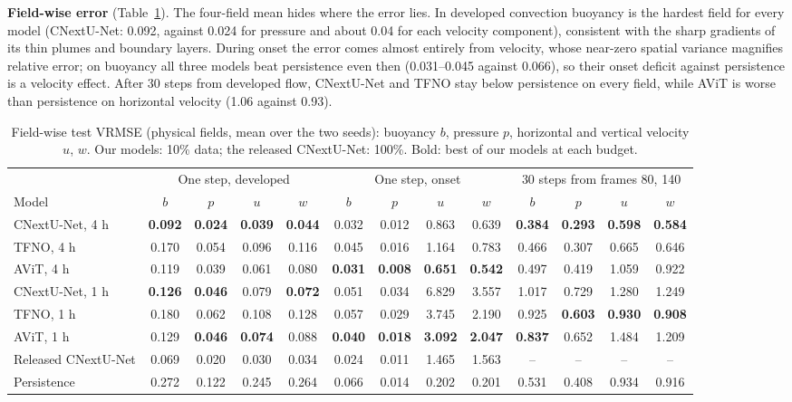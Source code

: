 \documentclass[11pt]{article}
\begin{document}
\textbf{Field-wise error} (Table~\ref{tab:fields}). The four-field mean hides where the error lies. In developed
convection buoyancy is the hardest field for every model (CNextU-Net: 0.092, against 0.024 for pressure and about
0.04 for each velocity component), consistent with the sharp gradients of its thin plumes and boundary layers. During
onset the error comes almost entirely from velocity, whose near-zero spatial variance magnifies relative error; on
buoyancy all three models beat persistence even then (0.031--0.045 against 0.066), so their onset deficit against
persistence is a velocity effect. After 30 steps from developed flow, CNextU-Net and TFNO stay below persistence on
every field, while AViT is worse than persistence on horizontal velocity (1.06 against 0.93).

\begin{table}[!htbp]
\centering\footnotesize
\setlength{\tabcolsep}{3.2pt}
\begin{tabular}{@{}lcccccccccccc@{}}
\toprule
& \multicolumn{4}{c}{One step, developed} & \multicolumn{4}{c}{One step, onset} & \multicolumn{4}{c}{30 steps from frames 80, 140} \\
\cmidrule(lr){2-5}\cmidrule(lr){6-9}\cmidrule(l){10-13}
Model & $b$ & $p$ & $u$ & $w$ & $b$ & $p$ & $u$ & $w$ & $b$ & $p$ & $u$ & $w$ \\
\midrule
CNextU-Net, 4 h & \textbf{0.092} & \textbf{0.024} & \textbf{0.039} & \textbf{0.044} & 0.032 & 0.012 & 0.863 & 0.639 & \textbf{0.384} & \textbf{0.293} & \textbf{0.598} & \textbf{0.584} \\
TFNO, 4 h & 0.170 & 0.054 & 0.096 & 0.116 & 0.045 & 0.016 & 1.164 & 0.783 & 0.466 & 0.307 & 0.665 & 0.646 \\
AViT, 4 h & 0.119 & 0.039 & 0.061 & 0.080 & \textbf{0.031} & \textbf{0.008} & \textbf{0.651} & \textbf{0.542} & 0.497 & 0.419 & 1.059 & 0.922 \\
\midrule
CNextU-Net, 1 h & \textbf{0.126} & \textbf{0.046} & 0.079 & \textbf{0.072} & 0.051 & 0.034 & 6.829 & 3.557 & 1.017 & 0.729 & 1.280 & 1.249 \\
TFNO, 1 h & 0.180 & 0.062 & 0.108 & 0.128 & 0.057 & 0.029 & 3.745 & 2.190 & 0.925 & \textbf{0.603} & \textbf{0.930} & \textbf{0.908} \\
AViT, 1 h & 0.129 & \textbf{0.046} & \textbf{0.074} & 0.088 & \textbf{0.040} & \textbf{0.018} & \textbf{3.092} & \textbf{2.047} & \textbf{0.837} & 0.652 & 1.484 & 1.209 \\
\midrule
Released CNextU-Net & 0.069 & 0.020 & 0.030 & 0.034 & 0.024 & 0.011 & 1.465 & 1.563 & -- & -- & -- & -- \\
Persistence & 0.272 & 0.122 & 0.245 & 0.264 & 0.066 & 0.014 & 0.202 & 0.201 & 0.531 & 0.408 & 0.934 & 0.916 \\
\bottomrule
\end{tabular}
\caption{Field-wise test VRMSE (physical fields, mean over the two seeds): buoyancy $b$, pressure $p$, horizontal
and vertical velocity $u$, $w$. Our models: 10\% data; the released CNextU-Net: 100\%. Bold: best of our
models at each budget.}
\label{tab:fields}
\end{table}
\end{document}

